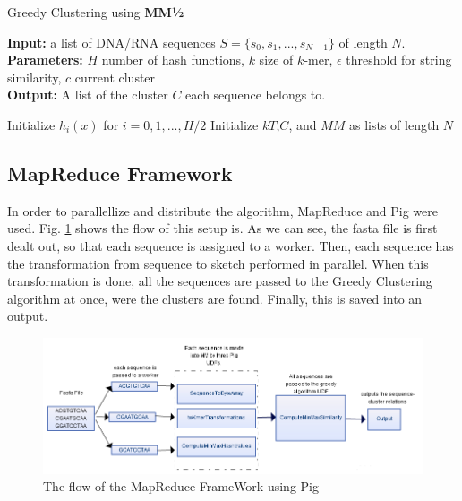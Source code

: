 \documentclass[../../main.tex]{subfiles}
\begin{document}
\begin{algorithm}
\caption{Greedy Clustering using {\bf MM½}}\label{alg:minmaxhalfclust}
\textbf{Input:} a list of DNA/RNA sequences $S=\{s_0,s_1,...,s_{N-1}\}$ of length $N$.\\
\textbf{Parameters:} $H$ number of hash functions, $k$ size of $k$-mer,	$\epsilon$ threshold for string similarity, $c$ current cluster \\
\textbf{Output:} A list of the cluster $C$ each sequence belongs to.
\begin{algorithmic}[1]
\State Initialize $h_i(x)$ for $i=0,1,...,H/2$
\State Initialize $kT$,$C$, and $MM$ as lists of length $N$
\EndFor
{}
					\EndIf
					\EndIf
				\EndFor
				\EndIf
			\EndIf
		\EndFor
	\EndIf
\EndFor
\end{algorithmic}
\end{algorithm}
\newpage

\subsection{MapReduce Framework}
In order to parallellize and distribute the algorithm, MapReduce and Pig were used. Fig. \ref{fig:mapredflow} shows the flow of this setup is. As we can see, the fasta file is first dealt out, so that each sequence is assigned to a worker. Then, each sequence has the transformation from sequence to sketch performed in parallel. When this transformation is done, all the sequences are passed to the Greedy Clustering algorithm at once, were the clusters are found. Finally, this is saved into an output.

\begin{figure}[h]
\includegraphics[scale=0.5]{data/MapReduce}
\caption{The flow of the MapReduce FrameWork using Pig}\label{fig:mapredflow}
\end{figure}
\end{document}
